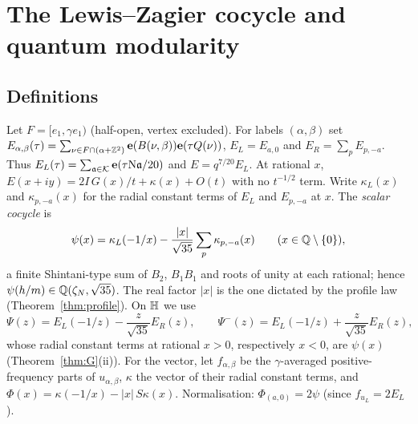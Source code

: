 \section{The Lewis--Zagier cocycle and quantum modularity}\label{sec:lz}

\subsection{Definitions}\label{sec:lzdef}
Let $F=[e_1,\gamma e_1)$ (half-open, vertex excluded). For labels $(\alpha,\beta)$ set
$E_{\alpha,\beta}(\tau)=\sum_{\nu\in F\cap(\alpha+\mathbb{Z}^2)}\mathbf{e}(B(\nu,\beta))\mathbf{e}(\tau Q(\nu))$, $E_L=E_{a,0}$ and $E_R=\sum_pE_{p,-a}$.
Thus $E_L(\tau)=\sum_{\mathfrak{a}\in\mathcal{K}}\mathbf{e}(\tau\mathrm{N}\mathfrak{a}/20)$ and $E=q^{7/20}E_L$. At rational $x$,
$E(x+iy)=2I\,G(x)/t+\kappa(x)+O(t)$ with no $t^{-1/2}$ term. Write $\kappa_L(x)$ and $\kappa_{p,-a}(x)$ for the radial constant terms of $E_L$ and $E_{p,-a}$ at $x$. The \emph{scalar cocycle} is
\[
\psi(x)=\kappa_L(-1/x)-\frac{|x|}{\sqrt{35}}\sum_p\kappa_{p,-a}(x)\qquad(x\in\mathbb{Q}\setminus\{0\}),
\]
a finite Shintani-type sum of $B_2$, $B_1B_1$ and roots of unity at each rational; hence $\psi(h/m)\in\mathbb{Q}(\zeta_N,\sqrt{35})$.
The real factor $|x|$ is the one dictated by the profile law (Theorem~\ref{thm:profile}). On $\mathbb{H}$ we use
\[
\Psi(z)=E_L(-1/z)-\frac{z}{\sqrt{35}}E_R(z),\qquad \Psi^-(z)=E_L(-1/z)+\frac{z}{\sqrt{35}}E_R(z),
\]
whose radial constant terms at rational $x>0$, respectively $x<0$, are $\psi(x)$ (Theorem~\ref{thm:G}(ii)).
For the vector, let $f_{\alpha,\beta}$ be the $\gamma$-averaged positive-frequency parts of $u_{\alpha,\beta}$, $\kappa$ the vector of their radial
constant terms, and $\Phi(x)=\kappa(-1/x)-|x|\,S\kappa(x)$. Normalisation: $\Phi_{(a,0)}=2\psi$ (since $f_{u_L}=2E_L$).

